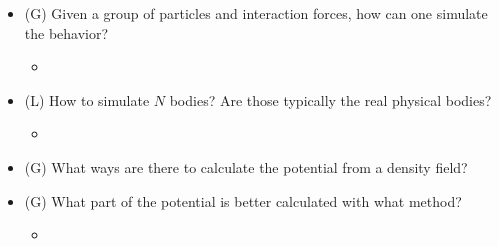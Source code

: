 \begin{itemize}
    \item (G) Given a group of particles and interaction forces, how can one simulate the behavior?
    \begin{itemize}
        \item {}
    \end{itemize}
    \item (L) How to simulate $N$ bodies? Are those typically the real physical bodies?
    \begin{itemize}
        \item {}
    \end{itemize}
    \item (G) What ways are there to calculate the potential from a density field?
    \item (G) What part of the potential is better calculated with what method?
    \begin{itemize}
        \item {}
    \end{itemize}
\end{itemize}

